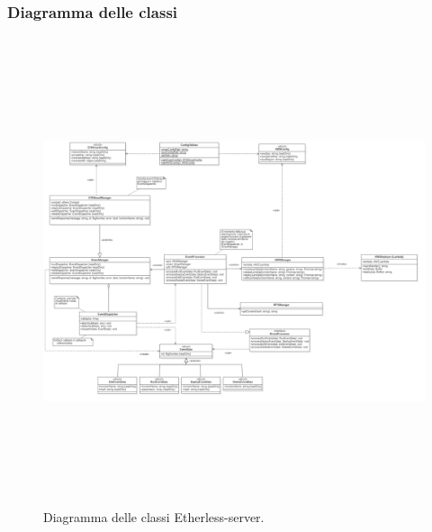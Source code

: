 \restoregeometry
{}
\begin{landscape}
\subsubsection{Diagramma delle classi}
	\begin{figure}[H]
		\includegraphics[width=23cm, height=13.7cm]{././diagrammi/etherless-server/Etherless-server-classi.png}
		\caption{Diagramma delle classi Etherless-server.}
	\end{figure}
\end{landscape}
\restoregeometry
